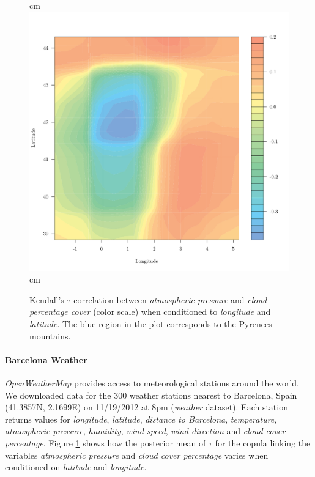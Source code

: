 \documentclass{article}
\begin{document}
\begin{figure}[b!]
  \begin{center}
     cm
    \includegraphics[width=\linewidth]{figures/bcn_contour.pdf}
     cm
    \caption{Kendall's $\tau$ correlation between \emph{atmospheric
    pressure} and \emph{cloud percentage cover} (color scale) when conditioned
    to \emph{longitude} and \emph{latitude}.  The blue region
    in the plot corresponds to the Pyrenees mountains.}
    \label{fig:bcn_tau}
  \end{center}
\end{figure}

\paragraph{Barcelona Weather}
\emph{OpenWeatherMap} \cite{open_weather} provides access to meteorological
stations around the world. We downloaded data for the 300 weather stations
nearest to Barcelona, Spain (41.3857N, 2.1699E) on 11/19/2012 at 8pm
(\emph{weather} dataset). Each station returns values for \emph{longitude},
\emph{latitude}, \emph{distance to Barcelona}, \emph{temperature},
\emph{atmospheric pressure}, \emph{humidity}, \emph{wind speed}, \emph{wind
direction} and \emph{cloud cover percentage}.  Figure \ref{fig:bcn_tau} shows
how the posterior mean of $\tau$ for the copula linking the variables
\emph{atmospheric pressure} and \emph{cloud cover percentage} varies when
conditioned on \emph{latitude} and \emph{longitude}.
\end{document}
